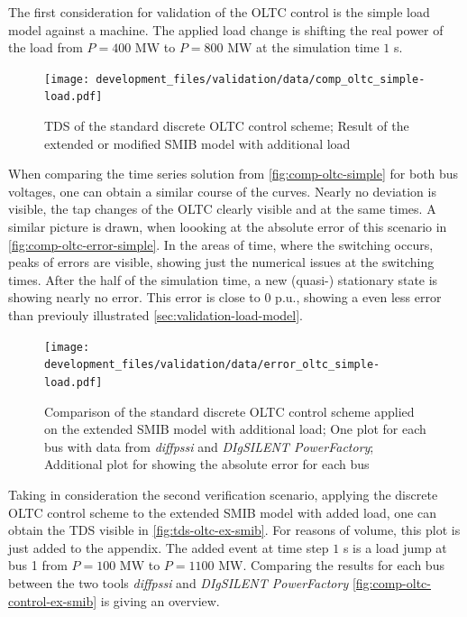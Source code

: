 The first consideration for validation of the \acs{OLTC} control is the simple load model against a machine.
The applied load change is shifting the real power of the load from $P=400\text{ MW}$ to $P=800\text{ MW}$ at the simulation time $1$ s.

\begin{figure}[htbp!]
    \centering
    \texttt{[image: development\_files/validation/data/comp\_oltc\_simple-load.pdf]}
    \caption[Time Domain Result of the OLTC control scheme applied on the extended \acs{SMIB} network]{\acf{TDS} of the standard discrete \acs{OLTC} control scheme; Result of the extended or modified \acs{SMIB} model with additional load}
    \label{fig:comp-oltc-simple}
\end{figure}

When comparing the time series solution from \autoref{fig:comp-oltc-simple} for both bus voltages, one can obtain a similar course of the curves. 
Nearly no deviation is visible, the tap changes of the \acs{OLTC} clearly visible and at the same times.
A similar picture is drawn, when loooking at the absolute error of this scenario in \autoref{fig:comp-oltc-error-simple}.
In the areas of time, where the switching occurs, peaks of errors are visible, showing just the numerical issues at the switching times.
After the half of the simulation time, a new (quasi-) stationary state is showing nearly no error.
This error is close to $0$ p.u., showing a even less error than previouly illustrated \autoref{sec:validation-load-model}.

\begin{figure}[htbp!]
    \centering
    \texttt{[image: development\_files/validation/data/error\_oltc\_simple-load.pdf]}
    \caption[Bus and Error Comparison for the standard discrete \acs{OLTC} scheme applied on the extended \acs{SMIB} model with load]{Comparison of the standard discrete \acs{OLTC} control scheme applied on the extended \acs{SMIB} model with additional load; One plot for each bus with data from \textit{diffpssi} and \textit{DIgSILENT PowerFactory}; Additional plot for showing the absolute error for each bus}
    \label{fig:comp-oltc-error-simple}
\end{figure}

Taking in consideration the second verification scenario, applying the discrete \acs{OLTC} control scheme to the extended \acs{SMIB} model with added load, one can obtain the \acs{TDS} visible in \autoref{fig:tds-oltc-ex-smib}.
For reasons of volume, this plot is just added to the appendix.
The added event at time step $1$ s is a load jump at bus 1 from $P=100\text{ MW}$ to $P=1100\text{ MW}$.
Comparing the results for each bus between the two tools \textit{diffpssi} and \textit{DIgSILENT PowerFactory} \autoref{fig:comp-oltc-control-ex-smib} is giving an overview.

